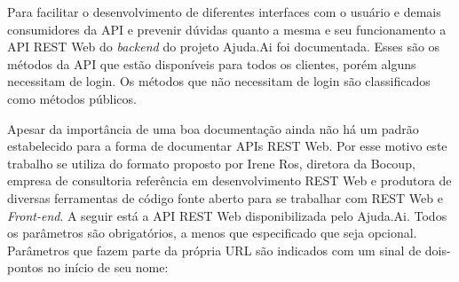 Para facilitar o desenvolvimento de diferentes interfaces com o usuário e demais consumidores da API e prevenir dúvidas quanto a mesma e seu funcionamento a API REST Web do \emph{backend} do projeto Ajuda.Ai foi documentada. Esses são os métodos da API que estão disponíveis para todos os clientes, porém alguns necessitam de login. Os métodos que não necessitam de login são classificados como métodos públicos.

Apesar da importância de uma boa documentação ainda não há um padrão estabelecido para a forma de documentar APIs REST Web. Por esse motivo este trabalho se utiliza do formato proposto por Irene Ros\cite{blog:bocoup}, diretora da Bocoup, empresa de consultoria referência em desenvolvimento REST Web e produtora de diversas ferramentas de código fonte aberto para se trabalhar com REST Web e \emph{Front-end}. A seguir está a API REST Web disponibilizada pelo Ajuda.Ai. Todos os parâmetros são obrigatórios, a menos que especificado que seja opcional. Parâmetros que fazem parte da própria URL são indicados com um sinal de dois-pontos no início de seu nome:

